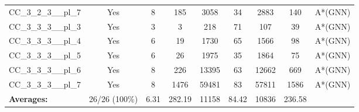 \documentclass{article}
\begin{document}
\begin{tabular}{lcccccccc}
CC\_3\_2\_3\_\_pl\_7 & Yes & 8 & 185 & 3058 & 34 & 2883 & 140 & A*(GNN) \\
CC\_3\_3\_3\_\_pl\_3 & Yes & 3 & 3 & 218 & 71 & 107 & 39 & A*(GNN) \\
CC\_3\_3\_3\_\_pl\_4 & Yes & 6 & 19 & 1730 & 65 & 1566 & 98 & A*(GNN) \\
CC\_3\_3\_3\_\_pl\_5 & Yes & 6 & 26 & 1975 & 35 & 1864 & 75 & A*(GNN) \\
CC\_3\_3\_3\_\_pl\_6 & Yes & 8 & 226 & 13395 & 63 & 12662 & 669 & A*(GNN) \\
CC\_3\_3\_3\_\_pl\_7 & Yes & 8 & 1476 & 59481 & 83 & 57811 & 1586 & A*(GNN) \\
\textbf{Averages:} & 26/26 (100\%) & 6.31 & 282.19 & 11158 & 84.42 & 10836 & 236.58 & \\
\bottomrule
\end{tabular}
\\[0.7cm]
\end{document}
